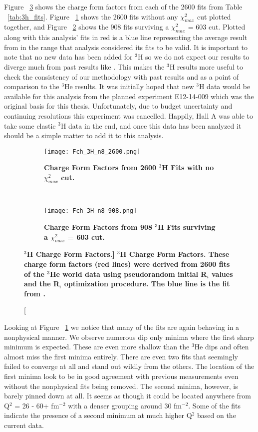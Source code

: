 Figure ~\ref{fig:3h_fch} shows the charge form factors from each of the 2600 fits from Table ~\ref{tab:3h_fits}. Figure ~\ref{fig:3h_fch_no_cut} shows the 2600 fits without any $\chi^2_{max}$ cut plotted together, and Figure ~\ref{fig:3h_fch_cut} shows the 908 fits surviving a $\chi^2_{max}$ = 603 cut. Plotted along with this analysis' fits in red is a blue line representing the average result from \cite{Article:Amroun} in the range that analysis considered its fits to be valid. It is important to note that no new data has been added for $^3$H so we do not expect our results to diverge much from past results like \cite{Article:Amroun}. This makes the $^3$H results more useful to check the consistency of our methodology with past results and as a point of comparison to the $^3$He results. It was initially hoped that new $^3$H data would be available for this analysis from the planned experiment E12-14-009 \cite{3h_proposal} which was the original basis for this thesis. Unfortunately, due to budget uncertainty and continuing resolutions this experiment was cancelled. Happily, Hall A was able to take some elastic $^3$H data in the end, and once this data has been analyzed it should be a simple matter to add it to this analysis.

\begin{figure}[!ht]
\begin{subfigure}{1.\textwidth}
  \centering
  \texttt{[image: Fch\_3H\_n8\_2600.png]}
  \caption{\bf{Charge Form Factors from 2600 $^3$H Fits with no $\chi^2_{max}$ cut.}}
  \label{fig:3h_fch_no_cut}
\end{subfigure}\\
\begin{subfigure}{1.\textwidth}
  \centering
  \texttt{[image: Fch\_3H\_n8\_908.png]}
  \caption{\bf{Charge Form Factors from 908 $^3$H Fits surviving a $\chi^2_{max}$ = 603 cut.}}
  \label{fig:3h_fch_cut}
\end{subfigure}
\caption[\bf{$^3$H Charge Form Factors.}] {
{\bf{$^3$H Charge Form Factors.}} These charge form factors (red lines) were derived from 2600 fits of the $^3$He world data using pseudorandom initial R$_i$ values and the R$_i$ optimization procedure. The blue line is the fit from \cite{Article:Amroun}.}
\label{fig:3h_fch}
\end{figure}

Looking at Figure ~\ref{fig:3h_fch_no_cut} we notice that many of the fits are again behaving in a nonphysical manner. We observe numerous dip only minima where the first sharp minimum is expected. These are even more shallow than the $^3$He dips and often almost miss the first minima entirely. There are even two fits that seemingly failed to converge at all and stand out wildly from the others. The location of the first minima look to be in good agreement with previous measurements even without the nonphysical fits being removed. The second minima, however, is barely pinned down at all. It seems as though it could be located anywhere from Q$^2$ = 26 - 60+ fm$^{-2}$ with a denser grouping around 30 fm$^{-2}$. Some of the fits indicate the presence of a second minimum at much higher Q$^2$ based on the current data. 

